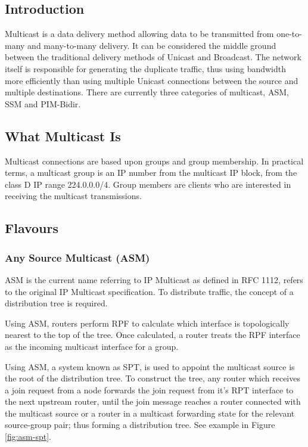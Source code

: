 
\subsection{Introduction}

Multicast is a data delivery method allowing data to be transmitted from
one-to-many and many-to-many delivery. It can be considered the middle
ground between the traditional delivery methods of Unicast and
Broadcast. The network itself is responsible for generating the 
duplicate traffic, thus using bandwidth more efficiently than using 
multiple Unicast connections between the source and multiple 
destinations. There are currently three categories of multicast, ASM, 
SSM and PIM-Bidir.

\subsection{What Multicast Is}

Multicast connections are based upon groups and group membership. In
practical terms, a multicast group is an IP number from the multicast IP
block, from the class D IP range 224.0.0.0/4. Group members are clients
who are interested in receiving the multicast transmissions.

\subsection{Flavours}

\subsubsection{Any Source Multicast (ASM)}
\label{sec:asm}

ASM is the current name referring to IP Multicast as defined in RFC
1112, refers to the original IP Multicast specification. To distribute
traffic, the concept of a distribution tree is required. 


Using ASM, routers perform RPF to calculate which interface is 
topologically nearest to the top of the tree. Once calculated, a router
treats the RPF interface as the incoming multicast interface for a
group.


Using ASM, a system known as SPT, is used to appoint the multicast
source is the root of the distribution tree. To construct the tree, any
router which receives a join request from a node forwards the join
request from it's RPT interface to the next upstream router, until the 
join message reaches a router connected with the multicast source or a
router in a multicast forwarding state for the relevant source-group
pair; thus forming a distribution tree. See example in Figure 
\ref{fig:asm-spt}.

